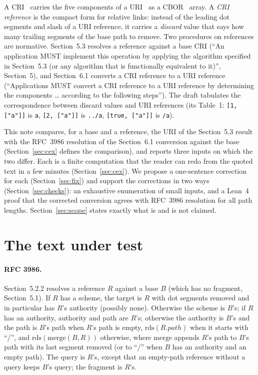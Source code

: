 \documentclass[11pt,a4paper]{article}
\theoremstyle{remark}
\newcommand{\cri}[1]{\texttt{#1}}
\newcommand{\uri}[1]{\texttt{#1}}
\newcommand{\rds}{\mathrm{rds}}
\newcommand{\mergef}{\mathrm{merge}}
\begin{document}
A CRI~\cite{href} carries the five components of a URI~\cite{rfc3986} as a CBOR~\cite{rfc8949} array.
A \emph{CRI reference} is the compact form for relative links: instead of the leading dot segments and
slash of a URI reference, it carries a \emph{discard} value that says how many trailing segments of the
base path to remove. Two procedures on references are normative. Section~5.3 resolves a reference
against a base CRI (``An application MUST implement this operation by applying the algorithm specified
in Section~5.3 (or any algorithm that is functionally equivalent to it)'', Section~5), and Section~6.1
converts a CRI reference to a URI reference (``Applications MUST convert a CRI reference to a URI
reference by determining the components \ldots{} according to the following steps''). The draft
tabulates the correspondence between discard values and URI references (its Table~1:
\cri{[1, ["a"]]} is \uri{a}, \cri{[2, ["a"]]} is \uri{../a}, \cri{[true, ["a"]]} is \uri{/a}).

This note compares, for a base and a reference, the URI of the Section~5.3 result with the RFC~3986
resolution of the Section~6.1 conversion against the base (Section~\ref{sec:cex} defines the comparison),
and reports three inputs on which the two differ. Each is a finite computation that the reader can
redo from the quoted text in a few minutes (Section~\ref{sec:cex}). We propose a one-sentence
correction for each (Section~\ref{sec:fix}) and support the corrections in two ways
(Section~\ref{sec:checks}): an exhaustive enumeration of small inputs, and a Lean~4 proof that the
corrected conversion agrees with RFC~3986 resolution for all path lengths. Section~\ref{sec:scope}
states exactly what is and is not claimed.

\section{The text under test}
\label{sec:bg}

\paragraph{RFC 3986.} Section~5.2.2 resolves a reference $R$ against a base $B$ (which has no fragment,
Section~5.1). If $R$ has a scheme, the target is $R$ with dot segments removed and in particular has
$R$'s authority (possibly none). Otherwise the scheme is $B$'s; if $R$ has an authority, authority and path
are $R$'s; otherwise the authority is $B$'s and the path is $B$'s path when $R$'s path is empty,
$\rds(R.\mathit{path})$ when it starts with ``/'', and $\rds(\mergef(B,R))$ otherwise, where $\mergef$
appends $R$'s path to $B$'s path with its last segment removed (or to ``/'' when $B$ has an authority
and an empty path). The query is $R$'s, except that an empty-path reference without a query keeps $B$'s
query; the fragment is $R$'s.
\end{document}

